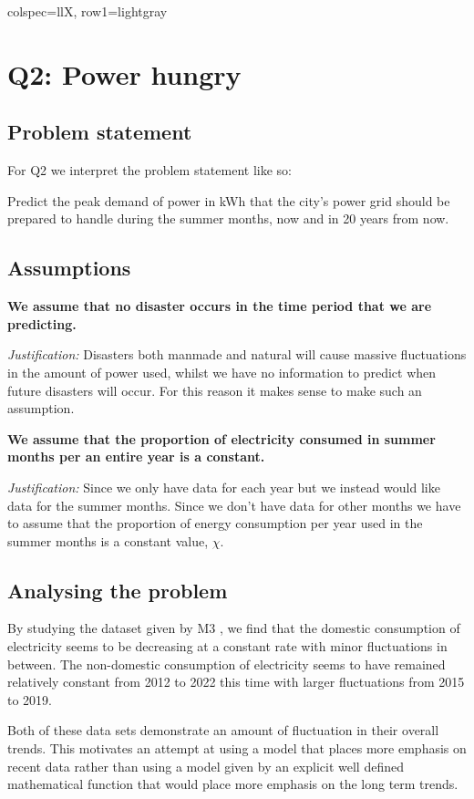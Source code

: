 \documentclass[11pt]{article}
\begin{document}
\begin{longtblr}[
  caption={Variables and parameters.}
]{
  colspec={llX},
  row{1}={lightgray}
}
\section{Q2: Power hungry}

\subsection{Problem statement}

For Q2 we interpret the problem statement like so:

Predict the peak demand of power in kWh that the city’s power grid should be prepared to handle during the summer months,
now and in 20 years from now.

\subsection{Assumptions}

\textbf{\sffamily We assume that no disaster occurs in the time period that we are predicting.}

\textit{Justification:} Disasters both manmade and natural will cause massive fluctuations in the amount of power used, whilst
we have no information to predict when future disasters will occur. For this reason it makes sense to make such an assumption.

\noindent
\textbf{\sffamily We assume that the proportion of electricity consumed in summer months per an entire year is a constant.}

\textit{Justification:} Since we only have data for each year but we instead would like data for the summer months. Since we
don't have data for other months we have to assume that the proportion of energy consumption per year used in the summer
months is a constant value, $\chi$.

\subsection{Analysing the problem}

By studying the dataset given by M3 \cite{m3}, we find that the domestic consumption of electricity seems to be decreasing at
a constant rate with minor fluctuations in between. The non-domestic consumption of electricity seems to have remained
relatively constant from 2012 to 2022 this time with larger fluctuations from 2015 to 2019.

Both of these data sets demonstrate an amount of fluctuation in their overall trends. This motivates an attempt at using a
model that places more emphasis on recent data rather than using a model given by an explicit well defined mathematical
function that would place more emphasis on the long term trends.


\end{longtblr}
\end{document}
